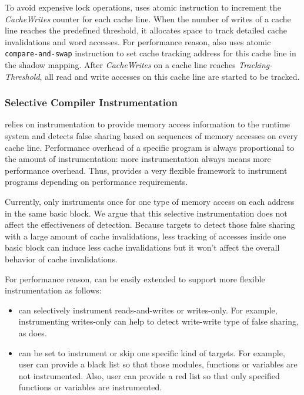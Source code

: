 To avoid expensive lock operations, \Predator{} uses atomic instruction to increment 
the {\it CacheWrites} counter for each cache line. 
When the number of writes of a cache line reaches the predefined threshold,
it allocates space to track detailed cache invalidations and word accesses.
For performance reason, \Predator{} also 
uses atomic \texttt{compare-and-swap} instruction to set cache tracking address for this cache line in
the shadow mapping.
After {\it CacheWrites} on a cache line reaches {\it Tracking-Threshold}, 
all read and write accesses on this cache line are started to be tracked.


\subsubsection{Selective Compiler Instrumentation}
\Predator{} relies on instrumentation to provide memory access information to the runtime system 
and detects false sharing based on sequences of memory accesses on every cache line. 
Performance overhead of a specific program is always proportional to 
the amount of instrumentation: more 
instrumentation always means more performance overhead. 
Thus, \Predator{} provides a very flexible framework to instrument programs 
depending on performance requirements. 

Currently, \Predator{} only instruments once for one type of memory access on each address 
in the same basic block. 
We argue that this selective instrumentation does not affect the effectiveness of detection. 
Because \Predator{} targets to detect those false sharing with a large amount of cache invalidations,
less tracking of accesses inside one basic block can induce less cache invalidations 
but it won't affect the overall behavior of cache invalidations. 

For performance reason, 
\Predator{} can be easily extended to support more flexible instrumentation as follows:
\begin{itemize}
\item
\Predator{} can selectively instrument reads-and-writes or writes-only. 
For example, instrumenting writes-only can help to detect write-write type of false sharing, 
as \Sheriff{} does. 
\item
\Predator{} can be set to instrument or skip one specific kind of targets. 
For example, user can provide a black list so that those modules,
functions or variables are not instrumented. 
Also, user can provide a red list so that only specified functions or variables are instrumented. 
\end{itemize}

